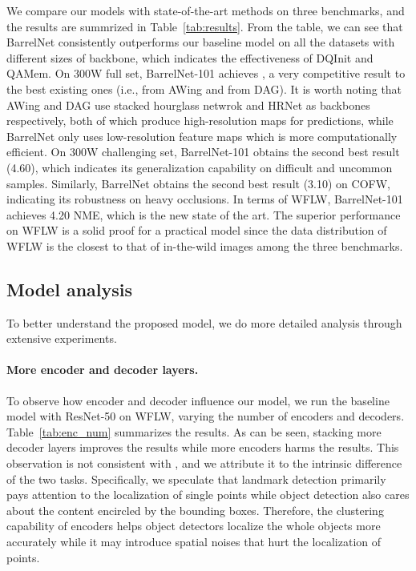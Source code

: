 \documentclass{article}
\begin{document}
We compare our models with state-of-the-art methods on three benchmarks, and the results are summrized in Table~\ref{tab:results}. From the table, we can see that BarrelNet consistently outperforms our baseline model on all the datasets with different sizes of backbone, which indicates the effectiveness of DQInit and QAMem. On 300W full set, BarrelNet-101 achieves , a very competitive result to the best existing ones (i.e.,  from AWing and  from DAG). It is worth noting that AWing and DAG use stacked hourglass netwrok and HRNet as backbones respectively, both of which produce high-resolution maps for predictions, while BarrelNet only uses low-resolution feature maps which is more computationally efficient. On 300W challenging set, BarrelNet-101 obtains the second best result (4.60), which indicates its generalization capability on difficult and uncommon samples. Similarly, BarrelNet obtains the second best result (3.10) on COFW, indicating its robustness on heavy occlusions. In terms of WFLW, BarrelNet-101 achieves 4.20 NME, which is the new state of the art. The superior performance on WFLW is a solid proof for a practical model since the data distribution of WFLW is the closest to that of in-the-wild images among the three benchmarks. 

\subsection{Model analysis}
\label{sec:4.3}

To better understand the proposed model, we do more detailed analysis through extensive experiments.

\paragraph{More encoder and decoder layers.}
To observe how encoder and decoder influence our model, we run the baseline model with ResNet-50 on WFLW, varying the number of encoders and decoders. Table~\ref{tab:enc_num} summarizes the results. As can be seen, stacking more decoder layers improves the results while more encoders harms the results. This observation is not consistent with \citet{CMS20}, and we attribute it to the intrinsic difference of the two tasks. Specifically, we speculate that landmark detection primarily pays attention to the localization of single points while object detection also cares about the content encircled by the bounding boxes. Therefore, the clustering capability of encoders helps object detectors localize the whole objects more accurately while it may introduce spatial noises that hurt the localization of points.
\end{document}
